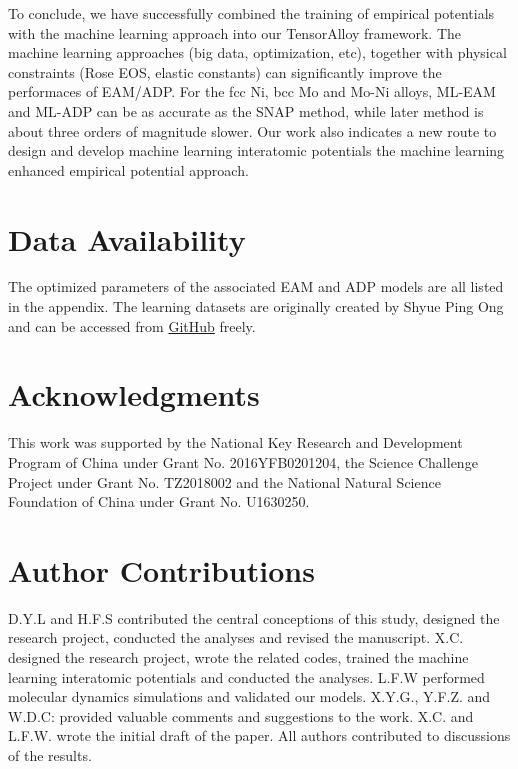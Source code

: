 \documentclass[final,3p,times]{elsarticle}
\begin{document}
To conclude, we have successfully combined the training of empirical potentials 
with the machine learning approach into our TensorAlloy framework. The machine 
learning approaches (big data, optimization, etc), 
together with physical constraints (Rose EOS, elastic constants) can 
significantly improve the performaces of EAM/ADP. For the fcc Ni, bcc Mo and 
Mo-Ni alloys, ML-EAM and ML-ADP can be as accurate as the SNAP method, while 
later method is about three orders of magnitude slower. Our work also indicates 
a new route to design and 
develop machine learning interatomic potentials \textemdash the machine learning 
enhanced empirical potential approach.

% 
%
\section*{Data Availability}
The optimized parameters of the associated EAM and ADP models are all listed in 
the appendix. The learning datasets are originally created by Shyue Ping Ong 
and can be accessed from 
\href{https://github.com/materialsvirtuallab/snap}{GitHub} freely.

% 
%
\section*{Acknowledgments}
\label{sec:acknowledgments}

This work was supported by the National Key Research and Development Program of 
China under Grant No. 2016YFB0201204, the Science Challenge Project under Grant 
No. TZ2018002 and the National Natural Science Foundation of China under Grant 
No. U1630250.

% 
%
\section*{Author Contributions}
D.Y.L and H.F.S contributed the central conceptions of this study, designed 
the research project, conducted the analyses and revised the manuscript. X.C. 
designed the research project, wrote the related codes, trained the machine 
learning interatomic potentials and conducted the analyses. L.F.W performed 
molecular dynamics simulations and validated our models. X.Y.G., Y.F.Z. and 
W.D.C: provided valuable comments and suggestions to the work. X.C. and L.F.W. 
wrote the initial draft of the paper. All authors contributed to discussions of 
the results.
\end{document}
